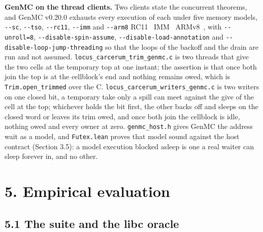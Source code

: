 \textbf{GenMC on the thread clients.} Two clients state the concurrent theorems, and GenMC v0.20.0 exhausts every execution of each under five memory models, \texttt{-\allowbreak{}-\allowbreak{}sc}, \texttt{-\allowbreak{}-\allowbreak{}tso}, \texttt{-\allowbreak{}-\allowbreak{}rc11}, \texttt{-\allowbreak{}-\allowbreak{}imm} and \texttt{-\allowbreak{}-\allowbreak{}arm8} RC11~\cite{src:RC11} IMM~\cite{src:IMM} ARMv8~\cite{src:ARMv8}, with \texttt{-\allowbreak{}-\allowbreak{}unroll=8}, \texttt{-\allowbreak{}-\allowbreak{}disable-\allowbreak{}spin-\allowbreak{}assume}, \texttt{-\allowbreak{}-\allowbreak{}disable-\allowbreak{}load-\allowbreak{}annotation} and \texttt{-\allowbreak{}-\allowbreak{}disable-\allowbreak{}loop-\allowbreak{}jump-\allowbreak{}threading} so that the loops of the backoff and the drain are run and not assumed. \texttt{locus\_\allowbreak{}carcerum\_\allowbreak{}trim\_\allowbreak{}genmc.\allowbreak{}c} is two threads that give the two cells at the temporary top at one instant; the assertion is that once both join the top is at the cellblock's end and nothing remains owed, which is \texttt{Trim.\allowbreak{}open\_\allowbreak{}trimmed} over the C. \texttt{locus\_\allowbreak{}carcerum\_\allowbreak{}writers\_\allowbreak{}genmc.\allowbreak{}c} is two writers on one closed bit, a temporary take only a spill can meet against the give of the cell at the top; whichever holds the bit first, the other backs off and sleeps on the closed word or leaves its trim owed, and once both join the cellblock is idle, nothing owed and every owner at zero. \texttt{genmc\_\allowbreak{}host.\allowbreak{}h} gives GenMC the address wait as a model, and \texttt{Futex.\allowbreak{}lean} proves that model sound against the host contract (Section 3.5): a model execution blocked asleep is one a real waiter can sleep forever in, and no other.

\section{\texorpdfstring{5. Empirical evaluation}{5. Empirical evaluation}}

\subsection{\texorpdfstring{5.1 The suite and the libc oracle}{5.1 The suite and the libc oracle}}

